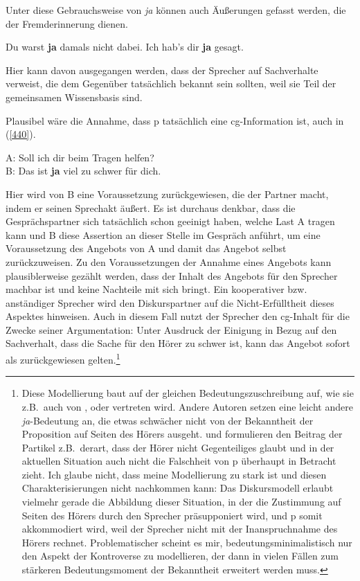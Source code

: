 Unter diese Gebrauchsweise von \textit{ja} können auch Äußerungen gefasst werden, die der Fremderinnerung dienen. 

\begin{exe}
	\ex\label{439} 
	\begin{xlist}
		\ex\label{439a} Du warst \textbf{ja} damals nicht dabei.	
 		\ex\label{439b}	Ich hab's dir \textbf{ja} gesagt.		
 		\hfill\hbox{\citet[344/345]{Reiter1980}}		
 	\end{xlist}	
\end{exe}
Hier kann davon ausgegangen werden, dass der Sprecher auf Sachverhalte verweist, die dem Gegenüber tatsächlich bekannt sein sollten, weil sie Teil der gemeinsamen Wissensbasis sind. 

Plausibel wäre die Annahme, dass p tatsächlich eine cg-Information ist, auch in (\ref{440}).

\begin{exe}
	\ex\label{440} 
	A: Soll ich dir beim Tragen helfen?\\
	B: Das ist \textbf{ja} viel zu schwer für dich.
	\hfill\hbox{\citet[141]{Dahl1988}}
\end{exe}
Hier wird von B eine Voraussetzung zurückgewiesen, die der Partner macht, indem er seinen Sprechakt äußert. Es ist durchaus denkbar, dass die Gesprächspartner sich tatsächlich schon geeinigt haben, welche Last A tragen kann und B diese Assertion an dieser Stelle im Gespräch anführt, um eine Voraussetzung des Angebots von A und damit das Angebot selbst zurückzuweisen. Zu den Voraussetzungen der Annahme eines Angebots kann plausiblerweise gezählt werden, dass der Inhalt des Angebots für den Sprecher machbar ist und keine Nachteile mit sich bringt. Ein kooperativer bzw. anständiger Sprecher wird den Diskurspartner auf die Nicht-Erfülltheit dieses Aspektes hinweisen. Auch in diesem Fall nutzt der Sprecher den cg-Inhalt für die Zwecke seiner Argumentation: Unter Ausdruck der Einigung in Bezug auf den Sachverhalt, dass die Sache für den Hörer zu schwer ist, kann das Angebot sofort als zurückgewiesen gelten.\footnote{Diese Modellierung baut auf der gleichen Bedeutungszuschreibung auf, wie sie z.B.\ auch von \citet[101]{Doherty1987}, \citet[104]{Thurmair1989} oder \citet[425]{Rinas2007} vertreten wird. Andere Autoren setzen eine leicht andere \textit{ja}-Bedeutung an, die etwas schwächer nicht von der Bekannt\-heit der Proposition auf Seiten des Hörers ausgeht. \citet[146]{Jacobs1991} und \citet[178]{Lindner1991} formulieren den Beitrag der Partikel z.B.\ derart, dass der Hörer nicht Gegenteiliges glaubt und in der aktuellen Situation auch nicht die Falschheit von p überhaupt in Betracht zieht. Ich glaube nicht, dass meine Modellierung zu stark ist und diesen Charakterisierungen nicht nachkommen kann: Das Diskursmodell erlaubt vielmehr gerade die Abbildung dieser Situation, in der die Zustimmung auf Seiten des Hörers durch den Sprecher präsupponiert wird, und p somit akkommodiert  wird, weil der Sprecher nicht mit der Inanspruchnahme des Hö\-rers rechnet. Problematischer scheint es mir, bedeutungsminimalistisch nur den Aspekt der Kontroverse zu modellieren, der dann in vielen Fällen zum stärkeren Bedeutungsmoment der Bekanntheit erweitert werden muss.}


